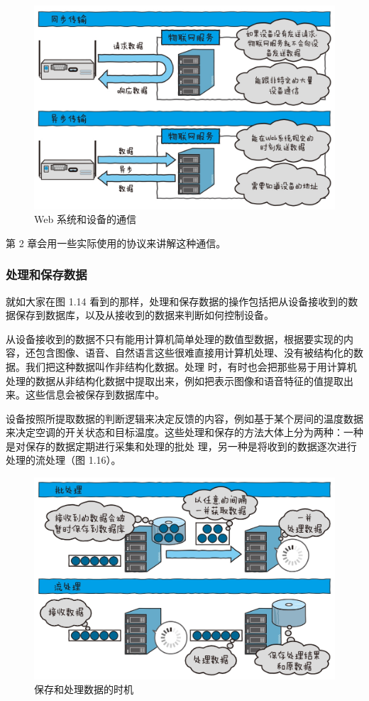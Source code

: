 \documentclass[12pt,UTF8]{ctexbook}
\begin{document}
\begin{figure}[htbp]
	\centering
	\includegraphics[width=1\linewidth]{15}
	\caption{Web 系统和设备的通信}
	\label{fig:1}
\end{figure}

第 2 章会用一些实际使用的协议来讲解这种通信。

\subsubsection{处理和保存数据}

就如大家在图 1.14 看到的那样，处理和保存数据的操作包括把从设备接收到的数据保存到数据库，以及从接收到的数据来判断如何控制设备。

从设备接收到的数据不只有能用计算机简单处理的数值型数据，根据要实现的内容，还包含图像、语音、自然语言这些很难直接用计算机处理、没有被结构化的数据。我们把这种数据叫作非结构化数据。处理
时，有时也会把那些易于用计算机处理的数据从非结构化数据中提取出来，例如把表示图像和语音特征的值提取出来。这些信息会被保存到数据库中。

设备按照所提取数据的判断逻辑来决定反馈的内容，例如基于某个房间的温度数据来决定空调的开关状态和目标温度。这些处理和保存的方法大体上分为两种：一种是对保存的数据定期进行采集和处理的批处
理，另一种是将收到的数据逐次进行处理的流处理（图 1.16）。

\begin{figure}[htbp]
	\centering
	\includegraphics[width=1\linewidth]{16}
	\caption{保存和处理数据的时机}
	\label{fig:1}
\end{figure}
\end{document}
